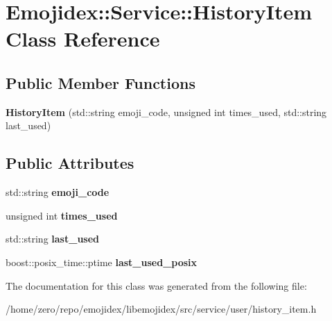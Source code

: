 \hypertarget{classEmojidex_1_1Service_1_1HistoryItem}{}\section{Emojidex\+:\+:Service\+:\+:History\+Item Class Reference}
\label{classEmojidex_1_1Service_1_1HistoryItem}
\subsection*{Public Member Functions}
\begin{DoxyCompactItemize}
\item 
{\bfseries History\+Item} (std\+::string emoji\+\_\+code, unsigned int times\+\_\+used, std\+::string last\+\_\+used)\hypertarget{classEmojidex_1_1Service_1_1HistoryItem_a83d81f8c40be75796eabea667e1d7400}{}\label{classEmojidex_1_1Service_1_1HistoryItem_a83d81f8c40be75796eabea667e1d7400}

\end{DoxyCompactItemize}
\subsection*{Public Attributes}
\begin{DoxyCompactItemize}
\item 
std\+::string {\bfseries emoji\+\_\+code}\hypertarget{classEmojidex_1_1Service_1_1HistoryItem_a98d6de7de108b4154cf4a47585af2489}{}\label{classEmojidex_1_1Service_1_1HistoryItem_a98d6de7de108b4154cf4a47585af2489}

\item 
unsigned int {\bfseries times\+\_\+used}\hypertarget{classEmojidex_1_1Service_1_1HistoryItem_a1cbf38f7c53d500fc9be47dfdeed167d}{}\label{classEmojidex_1_1Service_1_1HistoryItem_a1cbf38f7c53d500fc9be47dfdeed167d}

\item 
std\+::string {\bfseries last\+\_\+used}\hypertarget{classEmojidex_1_1Service_1_1HistoryItem_ac023cfba66fd6d1122d7d7b99009d441}{}\label{classEmojidex_1_1Service_1_1HistoryItem_ac023cfba66fd6d1122d7d7b99009d441}

\item 
boost\+::posix\+\_\+time\+::ptime {\bfseries last\+\_\+used\+\_\+posix}\hypertarget{classEmojidex_1_1Service_1_1HistoryItem_a30ffecf28921ab7593c889335789dfb1}{}\label{classEmojidex_1_1Service_1_1HistoryItem_a30ffecf28921ab7593c889335789dfb1}

\end{DoxyCompactItemize}


The documentation for this class was generated from the following file\+:\begin{DoxyCompactItemize}
\item 
/home/zero/repo/emojidex/libemojidex/src/service/user/history\+\_\+item.\+h\end{DoxyCompactItemize}
